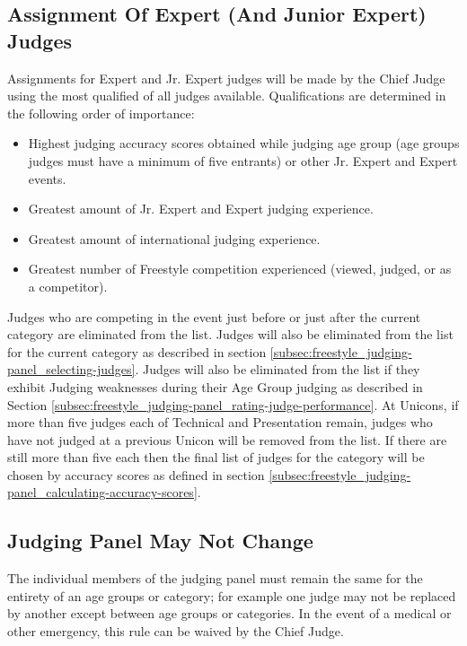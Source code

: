 \subsection{Assignment Of Expert (And Junior Expert) Judges \label{subsec:freestyle_judging-panel_assignment-of-expert-judges}}
Assignments for Expert and Jr. Expert judges will be made by the Chief Judge using the most qualified of all judges available.
Qualifications are determined in the following order of importance: 
\begin{itemize}
\item Highest judging accuracy scores obtained while judging age group (age groups judges must have a minimum of five entrants) or other Jr. Expert and Expert events.
\item Greatest amount of Jr. Expert and Expert judging experience.
\item Greatest amount of international judging experience.
\item Greatest number of Freestyle competition experienced (viewed, judged, or as a competitor).
\end{itemize}
Judges who are competing in the event just before or just after the current category are eliminated from the list.
Judges will also be eliminated from the list for the current category as described in section \ref{subsec:freestyle_judging-panel_selecting-judges}.
Judges will also be eliminated from the list if they exhibit Judging weaknesses during their Age Group judging as described in Section \ref{subsec:freestyle_judging-panel_rating-judge-performance}.
At Unicons, if more than five judges each of Technical and Presentation remain, judges who have not judged at a previous Unicon will be removed from the list.
If there are still more than five each then the final list of judges for the category will be chosen by accuracy scores as defined in section \ref{subsec:freestyle_judging-panel_calculating-accuracy-scores}.

\subsection{Judging Panel May Not Change}
The individual members of the judging panel must remain the same for the entirety of an age groups or category; for example one judge may not be replaced by another except between age groups or categories.
In the event of a medical or other emergency, this rule can be waived by the Chief Judge.

